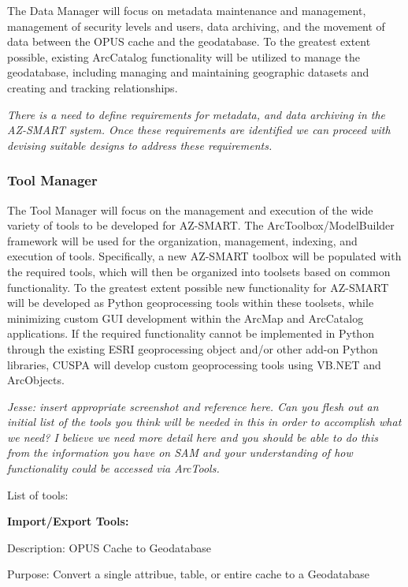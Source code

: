 The Data Manager will focus on metadata maintenance and management, management of security levels and users, data archiving, and the movement of data between the OPUS cache and the geodatabase.  To the greatest extent possible, existing ArcCatalog functionality will be utilized to manage the geodatabase, including managing and maintaining geographic datasets and creating and tracking relationships.

\emph{There is a need to define requirements for metadata, and data archiving in the AZ-SMART system.  Once these requirements are identified we can proceed with devising suitable designs to address these requirements.}

\subsubsection{Tool Manager}

The Tool Manager will focus on the management and execution of the wide variety of tools to be developed for AZ-SMART.  The ArcToolbox/ModelBuilder framework will be used for the organization, management, indexing, and execution of tools.  Specifically, a new AZ-SMART toolbox will be populated with the required tools, which will then be organized into toolsets based on common functionality.  To the greatest extent possible new functionality for AZ-SMART will be developed as Python geoprocessing tools within these toolsets, while minimizing custom GUI development within the ArcMap and ArcCatalog applications.  If the required functionality cannot be implemented in Python through the existing ESRI geoprocessing object and/or other add-on Python libraries, CUSPA will develop custom geoprocessing tools using VB.NET and ArcObjects.

\emph{Jesse: insert appropriate screenshot and reference here.  Can you flesh out an initial list of the tools you think will be needed in this in order to accomplish what we need?  I believe we need more detail here and you should be able to do this from the information you have on SAM and your understanding of how functionality could be accessed via ArcTools.}

\bigskip

List of tools:

\bigskip

\textbf{Import/Export Tools:}

\bigskip

Description: OPUS Cache to Geodatabase

Purpose: Convert a single attribue, table, or entire cache to a Geodatabase

